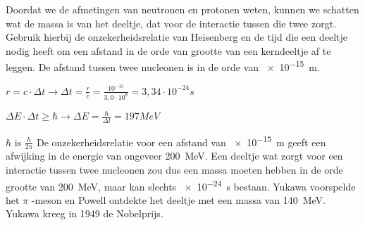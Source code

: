 \begin{questions}

\question
Doordat we de afmetingen van neutronen en protonen weten, kunnen we schatten wat
de massa is van het deeltje, dat voor de interactie tussen die twee zorgt.
Gebruik hierbij de onzekerheidsrelatie van Heisenberg en de tijd die een deeltje
nodig heeft om een afstand in de orde van grootte van een kerndeeltje af te leggen.
De afstand tussen twee nucleonen is in de orde van \SI{e-15}{m}.

\begin{solution}

$r = c \cdot \Delta t \rightarrow \Delta t = \frac{r}{c} = \frac{10^{-15}}{3,0\cdot 10^{8}}= 3,34\cdot 10^{-24} s$

$\Delta E \cdot \Delta t \geq \hbar \rightarrow \Delta E = \frac {\hbar}{\Delta t} = 197 MeV$

$\hbar$ is $ \frac{h}{2\pi}$
De onzekerheidsrelatie voor een afstand van \SI{e-15}{m} geeft een afwijking in de energie van
ongeveer \SI{200}{\mega\electronvolt}. Een deeltje wat zorgt voor een interactie tussen
twee nucleonen zou dus een massa moeten hebben in de orde grootte van \SI{200}{\mega\electronvolt},
maar kan slechts \SI{e-24}{\second} bestaan. Yukawa voorspelde het $\pi$ -meson en Powell ontdekte het deeltje
met een massa van \SI{140}{\mega\electronvolt}. Yukawa kreeg in 1949 de Nobelprijs.
\end{solution}


\end{questions}
